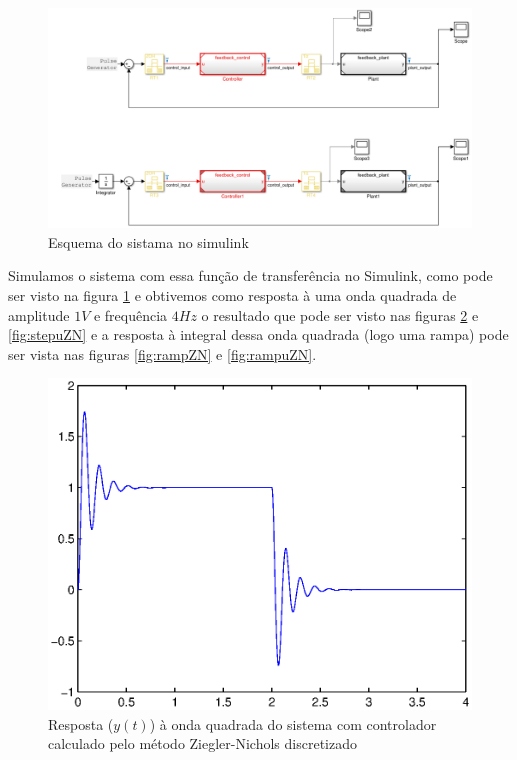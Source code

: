 \documentclass{article}
\begin{document}
	\begin{figure}[H]
		\centering
		\includegraphics[width=0.8\linewidth]{simulink}
		\caption{Esquema do sistama no simulink}
		\label{fig:simulink}
	\end{figure}
Simulamos o sistema com essa função de transferência no Simulink, como pode ser visto na figura \ref{fig:simulink} e obtivemos como resposta à uma onda quadrada de amplitude $1V$ e frequência $4Hz$ o resultado que pode ser visto nas figuras \ref{fig:stepZN} e \ref{fig:stepuZN} e a resposta à integral dessa onda quadrada (logo uma rampa) pode ser vista nas figuras \ref{fig:rampZN} e \ref{fig:rampuZN}.  
	\begin{figure}[H]
	\centering
	\includegraphics[width=0.8\linewidth]{stepZN}
	\caption{Resposta ($y(t)$) à onda quadrada do sistema com controlador calculado pelo método Ziegler-Nichols discretizado}
	\label{fig:stepZN}
	\end{figure}
\end{document}
